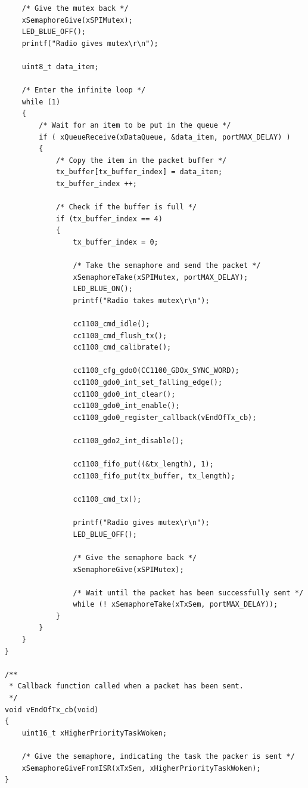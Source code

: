 \documentclass[11pt]{report}
\begin{document}
\begin{verbatim}
    /* Give the mutex back */
    xSemaphoreGive(xSPIMutex);
    LED_BLUE_OFF();
    printf("Radio gives mutex\r\n");
    
    uint8_t data_item;
    
    /* Enter the infinite loop */
    while (1)
    {
        /* Wait for an item to be put in the queue */
        if ( xQueueReceive(xDataQueue, &data_item, portMAX_DELAY) )
        {
            /* Copy the item in the packet buffer */
            tx_buffer[tx_buffer_index] = data_item;
            tx_buffer_index ++;
            
            /* Check if the buffer is full */
            if (tx_buffer_index == 4)
            {
                tx_buffer_index = 0;
                
                /* Take the semaphore and send the packet */
                xSemaphoreTake(xSPIMutex, portMAX_DELAY);
                LED_BLUE_ON();
                printf("Radio takes mutex\r\n");
                
                cc1100_cmd_idle();
                cc1100_cmd_flush_tx();
                cc1100_cmd_calibrate();

                cc1100_cfg_gdo0(CC1100_GDOx_SYNC_WORD);
                cc1100_gdo0_int_set_falling_edge();
                cc1100_gdo0_int_clear();
                cc1100_gdo0_int_enable();
                cc1100_gdo0_register_callback(vEndOfTx_cb);
                
                cc1100_gdo2_int_disable();
                
                cc1100_fifo_put((&tx_length), 1);
                cc1100_fifo_put(tx_buffer, tx_length);
                
                cc1100_cmd_tx();
                
                printf("Radio gives mutex\r\n");
                LED_BLUE_OFF();
                
                /* Give the semaphore back */
                xSemaphoreGive(xSPIMutex);
                
                /* Wait until the packet has been successfully sent */
                while (! xSemaphoreTake(xTxSem, portMAX_DELAY));
            }
        }
    }
}

/**
 * Callback function called when a packet has been sent.
 */
void vEndOfTx_cb(void)
{
    uint16_t xHigherPriorityTaskWoken; 
    
    /* Give the semaphore, indicating the task the packer is sent */
    xSemaphoreGiveFromISR(xTxSem, xHigherPriorityTaskWoken);
}

\end{verbatim}
\end{document}
